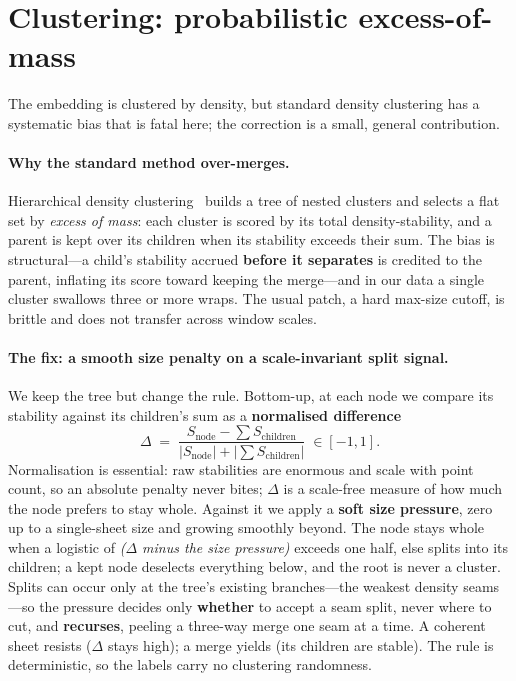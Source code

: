 \documentclass[10pt,twocolumn,a4paper]{article}
\begin{document}
\section{Clustering: probabilistic excess-of-mass}
The embedding is clustered by density, but standard density clustering has a
systematic bias that is fatal here; the correction is a small, general
contribution.

\paragraph{Why the standard method over-merges.} Hierarchical density
clustering~\cite{hdbscan} builds a tree of nested clusters and selects a flat set
by \emph{excess of mass}: each cluster is scored by its total density-stability,
and a parent is kept over its children when its stability exceeds their sum. The
bias is structural---a child's stability accrued \textbf{before it separates} is
credited to the parent, inflating its score toward keeping the merge---and in our
data a single cluster swallows three or more wraps. The usual patch, a hard
max-size cutoff, is brittle and does not transfer across window scales.

\paragraph{The fix: a smooth size penalty on a scale-invariant split signal.} We
keep the tree but change the rule. Bottom-up, at each node we compare its
stability against its children's sum as a \textbf{normalised difference}
\begin{equation}
  \Delta \;=\; \frac{S_{\text{node}} - \sum S_{\text{children}}}
                    {|S_{\text{node}}| + |\sum S_{\text{children}}|}\;\in[-1,1].
\end{equation}
Normalisation is essential: raw stabilities are enormous and scale with point
count, so an absolute penalty never bites; $\Delta$ is a scale-free measure of how
much the node prefers to stay whole. Against it we apply a \textbf{soft size
pressure}, zero up to a single-sheet size and growing smoothly beyond. The node
stays whole when a logistic of \emph{($\Delta$ minus the size pressure)} exceeds
one half, else splits into its children; a kept node deselects everything below,
and the root is never a cluster. Splits can occur only at the tree's existing
branches---the weakest density seams---so the pressure decides only \textbf{whether}
to accept a seam split, never where to cut, and \textbf{recurses}, peeling a
three-way merge one seam at a time. A coherent sheet resists ($\Delta$ stays
high); a merge yields (its children are stable). The rule is deterministic, so the
labels carry no clustering randomness.
\end{document}
